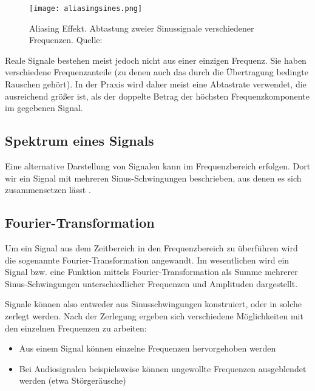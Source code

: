 \begin{figure}[ht]
	\centering
	\texttt{[image: aliasingsines.png]}
	\caption[Aliasing Effekt. Abtastung zweier Sinussignale verschiedener Frequenzen]{Aliasing Effekt. Abtastung zweier Sinussignale verschiedener Frequenzen. \newline Quelle: \cite[Moxfyre]{aliasingsampling:2009}} 
	\label{abtasttheorem}
\end{figure}

Reale Signale bestehen meist jedoch nicht aus einer einzigen Frequenz. Sie haben verschiedene Frequenzanteile (zu denen auch das durch die Übertragung bedingte Rauschen gehört).
In der Praxis wird daher meist eine Abtastrate verwendet, die ausreichend größer ist, als der doppelte Betrag der höchsten Frequenzkomponente im gegebenen Signal.





\subsection{Spektrum eines Signals}
Eine alternative Darstellung von Signalen kann im Frequenzbereich erfolgen. Dort wir ein Signal mit mehreren Sinus-Schwingungen beschrieben, aus denen es sich zusammensetzen lässt \cite[vgl. Karrenberg, S. 42]{Karrenberg:2017}.





\subsection{Fourier-Transformation}
Um ein Signal aus dem Zeitbereich in den Frequenzbereich zu überführen wird die sogenannte Fourier-Transformation angewandt.\newline
Im wesentlichen wird ein Signal bzw. eine Funktion mittels Fourier-Transformation als Summe mehrerer Sinus-Schwingungen unterschiedlicher Frequenzen und Amplituden dargestellt.

Signale können also entweder aus Sinusschwingungen konstruiert, oder in solche zerlegt werden.
Nach der Zerlegung ergeben sich verschiedene Möglichkeiten mit den einzelnen Frequenzen zu arbeiten:
\begin{itemize}
	\item Aus einem Signal können einzelne Frequenzen hervorgehoben werden
	\item Bei Audiosignalen beispielsweise können ungewollte Frequenzen ausgeblendet werden (etwa Störgeräusche)
\end{itemize}

